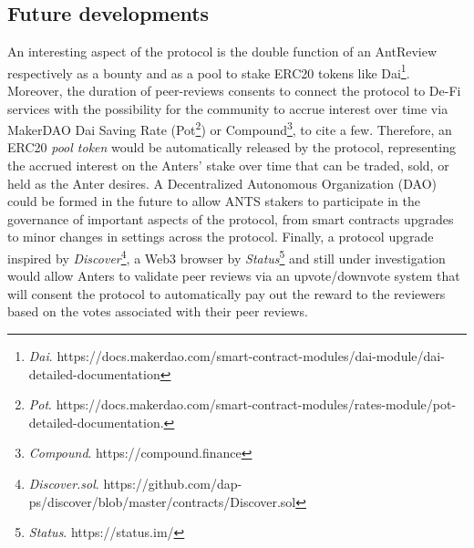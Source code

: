 \documentclass[runningheads]{llncs}
\begin{document}
\subsection{Future developments}
An interesting aspect of the protocol is the double function of an AntReview respectively as a bounty and as a pool to stake ERC20 tokens like Dai\footnote[14]{\emph{Dai}. https://docs.makerdao.com/smart-contract-modules/dai-module/dai-detailed-documentation}. Moreover, the duration of peer-reviews consents to connect the protocol to De-Fi services with the possibility for the community to accrue interest over time via MakerDAO Dai Saving Rate (Pot\footnote[15]{\emph{Pot}. https://docs.makerdao.com/smart-contract-modules/rates-module/pot-detailed-documentation.}) or Compound\footnote[16]{\emph{Compound}. https://compound.finance}, to cite a few.
Therefore, an ERC20 \emph{pool token} would be automatically released by the protocol, representing the accrued interest on the Anters' stake over time that can be traded, sold, or held as the Anter desires.
A Decentralized Autonomous Organization (DAO) \cite{Wang-DAO,DAOContr} could be formed in the future to allow ANTS stakers to participate in the governance of important aspects of the protocol, from smart contracts upgrades to minor changes in settings across the protocol.
\newline Finally, a protocol upgrade inspired by \emph{Discover}\footnote[17]{\emph{Discover.sol}. https://github.com/dap-ps/discover/blob/master/contracts/Discover.sol}, a Web3 browser by \emph{Status}\footnote[18]{\emph{Status}. https://status.im/} and still under investigation would allow Anters to validate peer reviews via an upvote/downvote system that will consent the protocol to automatically pay out the reward to the reviewers based on the votes associated with their peer reviews.
\end{document}
